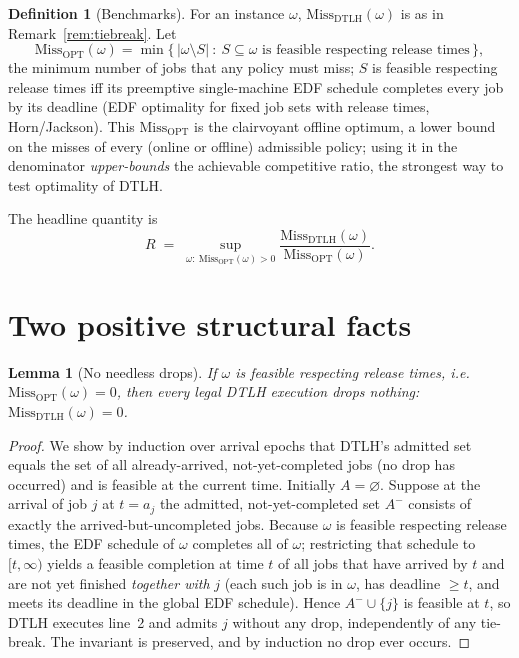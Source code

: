 \documentclass{amsart}
\newtheorem{lemma}[theorem]{Lemma}
\theoremstyle{definition}
\newtheorem{definition}[theorem]{Definition}
\begin{document}
\begin{definition}[Benchmarks]
For an instance $\omega$, $\mathrm{Miss}_{\mathrm{DTLH}}(\omega)$ is as in
Remark~\ref{rem:tiebreak}. Let
\begin{equation}\label{eq:opt}
\mathrm{Miss}_{\mathrm{OPT}}(\omega)
=\min\Big\{\,|\omega\setminus S|\ :\ S\subseteq\omega \text{ is feasible respecting release times}\,\Big\},
\end{equation}
the minimum number of jobs that any policy must miss; $S$ is feasible respecting
release times iff its preemptive single-machine EDF schedule completes every job
by its deadline (EDF optimality for fixed job sets with release times,
Horn/Jackson). This $\mathrm{Miss}_{\mathrm{OPT}}$ is the clairvoyant offline
optimum, a lower bound on the misses of every (online or offline) admissible
policy; using it in the denominator \emph{upper-bounds} the achievable
competitive ratio, the strongest way to test optimality of DTLH.
\end{definition}

The headline quantity is
\[
R \;=\; \sup_{\omega:\ \mathrm{Miss}_{\mathrm{OPT}}(\omega)>0}
\frac{\mathrm{Miss}_{\mathrm{DTLH}}(\omega)}{\mathrm{Miss}_{\mathrm{OPT}}(\omega)} .
\]

\section{Two positive structural facts}

\begin{lemma}[No needless drops]\label{lem:nowaste}
If $\omega$ is feasible respecting release times, i.e.\
$\mathrm{Miss}_{\mathrm{OPT}}(\omega)=0$, then \emph{every} legal DTLH execution
drops nothing: $\mathrm{Miss}_{\mathrm{DTLH}}(\omega)=0$.
\end{lemma}

\begin{proof}
We show by induction over arrival epochs that DTLH's admitted set equals the set
of all already-arrived, not-yet-completed jobs (no drop has occurred) and is
feasible at the current time. Initially $A=\varnothing$. Suppose at the arrival
of job $j$ at $t=a_j$ the admitted, not-yet-completed set $A^-$ consists of
exactly the arrived-but-uncompleted jobs. Because $\omega$ is feasible
respecting release times, the EDF schedule of $\omega$ completes all of $\omega$;
restricting that schedule to $[t,\infty)$ yields a feasible completion at time
$t$ of all jobs that have arrived by $t$ and are not yet finished \emph{together
with} $j$ (each such job is in $\omega$, has deadline $\ge t$, and meets its
deadline in the global EDF schedule). Hence $A^-\cup\{j\}$ is feasible at $t$, so
DTLH executes line~2 and admits $j$ without any drop, independently of any
tie-break. The invariant is preserved, and by induction no drop ever occurs.
\end{proof}
\end{document}
